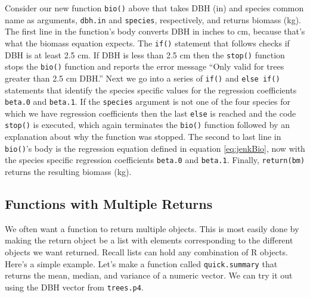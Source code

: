 \documentclass[]{krantz}
\makeatletter
\newenvironment{Shaded}{\begin{snugshade}}{\end{snugshade}}
\newcommand{\ControlFlowTok}[1]{\textcolor[rgb]{0.27,0.27,0.27}{\textbf{#1}}}
\newcommand{\DataTypeTok}[1]{\textcolor[rgb]{0.27,0.27,0.27}{#1}}
\newcommand{\ErrorTok}[1]{\textcolor[rgb]{0.14,0.14,0.14}{\textbf{#1}}}
\newcommand{\KeywordTok}[1]{\textcolor[rgb]{0.27,0.27,0.27}{\textbf{#1}}}
\newcommand{\NormalTok}[1]{#1}
\newcommand{\OperatorTok}[1]{\textcolor[rgb]{0.43,0.43,0.43}{\textbf{#1}}}
\newcommand{\StringTok}[1]{\textcolor[rgb]{0.5,0.5,0.5}{#1}}
\newenvironment{kframe}{%
\medskip{}
\setlength{\fboxsep}{.8em}
 \def\at@end@of@kframe{}%
 \ifinner\ifhmode%
  \def\at@end@of@kframe{\end{minipage}}%
  \begin{minipage}{\columnwidth}%
 \fi\fi%
 \def\FrameCommand##1{\hskip\@totalleftmargin \hskip-\fboxsep
 \colorbox{shadecolor}{##1}\hskip-\fboxsep
     \hskip-\linewidth \hskip-\@totalleftmargin \hskip\columnwidth}%
 \MakeFramed {\advance\hsize-\width
   \@totalleftmargin\z@ \linewidth\hsize
   \@setminipage}}%
 {\par\unskip\endMakeFramed%
 \at@end@of@kframe}
\renewenvironment{Shaded}{\begin{kframe}}{\end{kframe}}
\makeatother
\begin{document}
Consider our new function \texttt{bio()} above that takes DBH (in) and species common name as arguments, \texttt{dbh.in} and \texttt{species}, respectively, and returns biomass (kg). The first line in the function's body converts DBH in inches to cm, because that's what the \citet{jenkins03} biomass equation expects. The \texttt{if()} statement that follows checks if DBH is at least 2.5 cm. If DBH is less than 2.5 cm then the \texttt{stop()} function stops the \texttt{bio()} function and reports the error message ``Only valid for trees greater than 2.5 cm DBH.'' Next we go into a series of \texttt{if()} and \texttt{else\ if()} statements that identify the species specific values for the regression coefficients \texttt{beta.0} and \texttt{beta.1}. If the \texttt{species} argument is not one of the four species for which we have regression coefficients then the last \texttt{else} is reached and the code \texttt{stop()} is executed, which again terminates the \texttt{bio()} function followed by an explanation about why the function was stopped. The second to last line in \texttt{bio()}'s body is the regression equation defined in equation \eqref{eq:jenkBio}, now with the species specific regression coefficients \texttt{beta.0} and \texttt{beta.1}. Finally, \texttt{return(bm)} returns the resulting biomass (kg).

\hypertarget{functions-with-multiple-returns}{%
\subsection{Functions with Multiple Returns}\label{functions-with-multiple-returns}}

We often want a function to return multiple objects. This is most easily done by making the return object be a list with elements corresponding to the different objects we want returned. Recall lists can hold any combination of R objects. Here's a simple example. Let's make a function called \texttt{quick.summary} that returns the mean, median, and variance of a numeric vector. We can try it out using the DBH vector from \texttt{trees.p4}.

\begin{Shaded}
\end{Shaded}
\end{document}
